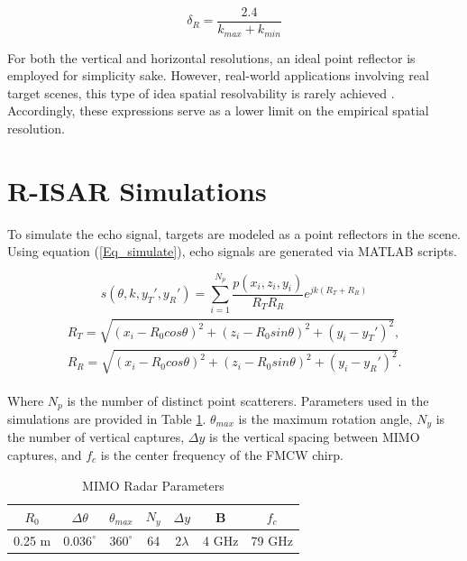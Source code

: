 \documentclass[conference]{IEEEtran}
\begin{document}
		\begin{equation}
			\delta_R = \frac{2.4}{k_{max} + k_{min}}
		\end{equation}
		
		For both the vertical and horizontal resolutions, an ideal point reflector is employed for simplicity sake. However, real-world applications involving real target scenes, this type of idea spatial resolvability is rarely achieved \cite{Gao:EfficientAlgorithmMIMOCylindrical}. Accordingly, these expressions serve as a lower limit on the empirical spatial resolution.
		
		\section{R-ISAR Simulations}
		\label{sec:simulations}
		
		To simulate the echo signal, targets are modeled as a point reflectors in the scene. Using equation (\ref{Eq_simulate}), echo signals are generated via MATLAB scripts.
		
		\begin{equation}
		\label{Eq_simulate}
		s(\theta,k,y_T',y_R') = \sum_{i = 1}^{N_p} \frac{p(x_i,z_i,y_i)}{R_T R_R} e^{jk(R_T + R_R)}
		\end{equation}
		\begin{align}
		\begin{split}
		R_T = \sqrt{(x_i - R_0 cos\theta)^2 + (z_i - R_0 sin\theta)^2 + (y_i - y_T')^2}, \\
		R_R = \sqrt{(x_i - R_0 cos\theta)^2 + (z_i - R_0 sin\theta)^2 + (y_i - y_R')^2}.
		\end{split}
		\end{align}
		
		Where $N_p$ is the number of distinct point scatterers. Parameters used in the simulations are provided in Table \ref{table_radar_parameters}. $\theta_{max}$ is the maximum rotation angle, $N_y$ is the number of vertical captures, $\Delta y$ is the vertical spacing between MIMO captures, and $f_c$ is the center frequency of the FMCW chirp.
		
		\begin{table} [h]
			\caption{\label{table_radar_parameters}MIMO Radar Parameters}
			\centering
			\begin{tabular}{c c c c c c c}
				\hline
				$R_0$ & $\Delta \theta$ & $\theta_{max}$ & $N_y$ & $\Delta y$ & B & $f_c$  \\ [0.5ex] 
				\hline\hline
				0.25 m & $0.036^{\circ}$ & $360^{\circ}$ & 64 & $2\lambda$ & 4 GHz & 79 GHz \\ 
				\hline
			\end{tabular}
		\end{table}
		
\end{document}
